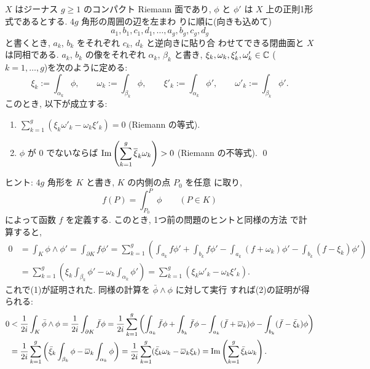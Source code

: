 \documentclass[12pt,twoside]{jarticle}
\def\bdr{\partial}
\def\C{{\Bbb C}} %
\def\Impart{\mathop{\text{\rm Im}}\nolimits} %
\def\Im{\mathop{\text{\rm Im}}\nolimits}     %
\begin{document}
\begin{question}
  $X$ はジーナス $g\ge1$ のコンパクト Riemann 面であり, $\phi$ と %
  $\phi'$ は $X$ 上の正則1形式であるとする. $4g$ 角形の周囲の辺を左まわ
  りに順に(向きも込めて)
  \[
     a_1,b_1,c_1,d_1,\dots,a_g,b_g,c_g,d_g
  \] %
  と書くとき, $a_k$, $b_k$ をそれぞれ $c_k$, $d_k$ と逆向きに貼り合
  わせてできる閉曲面と $X$ は同相である. $a_k$, $b_k$ の像をそれぞれ %
  $\alpha_k$, $\beta_k$ と書き, $\xi_k,\omega_k,\xi'_k,\omega'_k\in\C$
  ($k=1,\dots,g$)を次のように定める:
  \[
    \xi_k := \int_{\alpha_k}\phi,
    \qquad
    \omega_k := \int_{\beta_k}\phi,
    \qquad
    \xi'_k := \int_{\alpha_k}\phi',
    \qquad
    \omega'_k := \int_{\beta_k}\phi'.
  \]
  このとき, 以下が成立する:
  \begin{enumerate}
  \item \( \displaystyle
      \sum_{k=1}^g (\xi_k \omega'_k - \omega_k \xi'_k) = 0
    \) \quad (Riemann の等式).
  \item $\phi$ が $0$ でないならば \quad %
    \( \displaystyle
      \Im \left( \sum_{k=1}^g \overline\xi_k \omega_k \right) > 0
    \) \quad (Riemann の不等式). \qed
  \end{enumerate}
\end{question}

\noindent ヒント: $4g$ 角形を $K$ と書き, $K$ の内側の点 $P_0$ を任意
に取り, 
\[
  f(P) = \int_{P_0}^P \phi
  \qquad
  (P\in K)
\]
によって函数 $f$ を定義する. このとき, 1つ前の問題のヒントと同様の方法
で計算すると,
\begin{align*}
  0 
  & = 
  \int_K \phi\wedge\phi'
  =
  \int_{\bdr K} f \phi'
  =
  \sum_{k=1}^g
  \left(
      \int_{a_k} f \phi'
    + \int_{b_k} f \phi'
    - \int_{a_k} (f + \omega_k) \phi'
    - \int_{b_k} (f - \xi_k)    \phi'
  \right)
  \\
  & =
  \sum_{k=1}^g
  \left(
      \xi_k    \int_{\beta_k}  \phi'
    - \omega_k \int_{\alpha_k} \phi'
  \right)
  =
  \sum_{k=1}^g
  (\xi_k \omega'_k - \omega_k \xi'_k).
\end{align*}
これで(1)が証明された. 同様の計算を $\bar\phi\wedge\phi$ に対して実行
すれば(2)の証明が得られる:
\begin{align*}
  0
  & < 
  \frac{1}{2i}
  \int_K \bar\phi\wedge\phi
  =
  \frac{1}{2i}
  \int_{\bdr K} \bar f \phi
  =
  \frac{1}{2i}
  \sum_{k=1}^g
  \left(
      \int_{a_k} \bar f \phi
    + \int_{b_k} \bar f \phi
    - \int_{a_k} (\bar f + \overline\omega_k) \phi
    - \int_{b_k} (\bar f - \bar\xi_k)    \phi
  \right)
  \\
  & =
  \frac{1}{2i}
  \sum_{k=1}^g
  \left(
      \bar\xi_k         \int_{\beta_k}  \phi
    - \overline\omega_k \int_{\alpha_k} \phi
  \right)
  =
  \frac{1}{2i}
  \sum_{k=1}^g
  (\bar\xi_k \omega_k - \overline\omega_k \xi_k)
  =
  \Impart \left( \sum_{k=1}^g \bar\xi_k \omega_k \right).
\end{align*}
\end{document}

